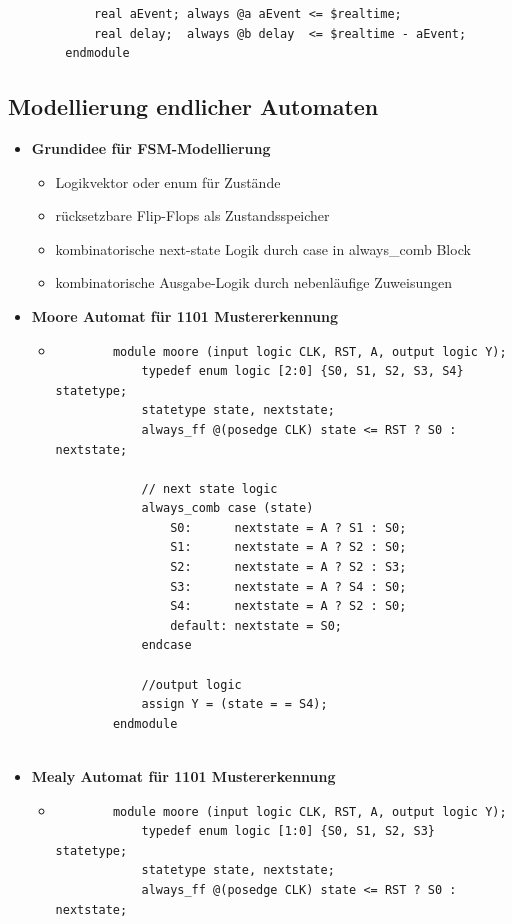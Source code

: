 \documentclass[11pt,a4paper]{article}
\begin{document}
\begin{itemize}
\begin{itemize}
\begin{lstlisting}
			real aEvent; always @a aEvent <= $realtime;
			real delay;  always @b delay  <= $realtime - aEvent;
		endmodule
		\end{lstlisting}
	\end{itemize}

\end{itemize}

\subsection{Modellierung endlicher Automaten}
\begin{itemize}
\item \textbf{Grundidee für FSM-Modellierung}
	\begin{itemize}
	\item Logikvektor oder enum für Zustände
	\item rücksetzbare Flip-Flops als Zustandsspeicher
	\item kombinatorische next-state Logik durch case in always\_comb Block
	\item kombinatorische Ausgabe-Logik durch nebenläufige Zuweisungen	
	
	\end{itemize}
	
\item \textbf{Moore Automat für 1101 Mustererkennung}
	\begin{itemize}
	\item[]
		\begin{lstlisting}
		module moore (input logic CLK, RST, A, output logic Y);
			typedef enum logic [2:0] {S0, S1, S2, S3, S4} statetype;
			statetype state, nextstate;
			always_ff @(posedge CLK) state <= RST ? S0 : nextstate;
			
			// next state logic
			always_comb case (state)
				S0: 	 nextstate = A ? S1 : S0;
				S1:		 nextstate = A ? S2 : S0;
				S2: 	 nextstate = A ? S2 : S3;
				S3: 	 nextstate = A ? S4 : S0;
				S4: 	 nextstate = A ? S2 : S0;
				default: nextstate = S0;
			endcase
			
			//output logic
			assign Y = (state = = S4);
		endmodule
				
		\end{lstlisting}
	\end{itemize}
	
\item \textbf{Mealy Automat für 1101 Mustererkennung}
	\begin{itemize}
	\item[]
		\begin{lstlisting}
		module moore (input logic CLK, RST, A, output logic Y);
			typedef enum logic [1:0] {S0, S1, S2, S3} statetype;
			statetype state, nextstate;
			always_ff @(posedge CLK) state <= RST ? S0 : nextstate;
			

\end{lstlisting}
\end{itemize}
\end{itemize}
\end{document}
